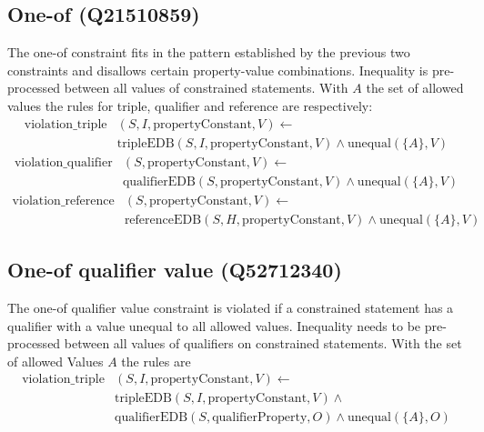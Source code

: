 \documentclass[hyperref,bachelorofscience,fleqn]{cgvpub}
\begin{document}
\subsection{One-of (Q21510859)}
The one-of constraint fits in the pattern established by the previous two constraints and disallows certain property-value combinations. Inequality is pre-processed between all values of constrained statements. With \(A\) the set of allowed values the rules for triple, qualifier and reference are respectively:
\begin{equation*}
\begin{split}
\text{violation\_triple}&(S, I, \text{propertyConstant}, V) \leftarrow \\
&\text{tripleEDB}(S, I, \text{propertyConstant}, V) \wedge \text{unequal}(\{A\}, V)
\end{split}
\end{equation*}
\begin{equation*}
\begin{split}
\text{violation\_qualifier}&(S, \text{propertyConstant}, V) \leftarrow \\
&\text{qualifierEDB}(S, \text{propertyConstant}, V) \wedge \text{unequal}(\{A\}, V)
\end{split}
\end{equation*}
\begin{equation*}
\begin{split}
\text{violation\_reference}&(S, \text{propertyConstant}, V) \leftarrow \\
&\text{referenceEDB}(S, H, \text{propertyConstant}, V) \wedge \text{unequal}(\{A\}, V)
\end{split}
\end{equation*}

\subsection{One-of qualifier value (Q52712340)}
The one-of qualifier value constraint is violated if a constrained statement has a qualifier with a value unequal to all allowed values. Inequality needs to be pre-processed between all values of qualifiers on constrained statements. With the set of allowed Values \(A\) the rules are
\begin{equation*}
\begin{split}
\text{violation\_triple}&(S, I, \text{propertyConstant}, V) \leftarrow \\
&\text{tripleEDB}(S, I, \text{propertyConstant}, V) \wedge \\
&\text{qualifierEDB}(S, \text{qualifierProperty}, O) \wedge \text{unequal}(\{A\}, O)
\end{split}
\end{equation*}
\end{document}
